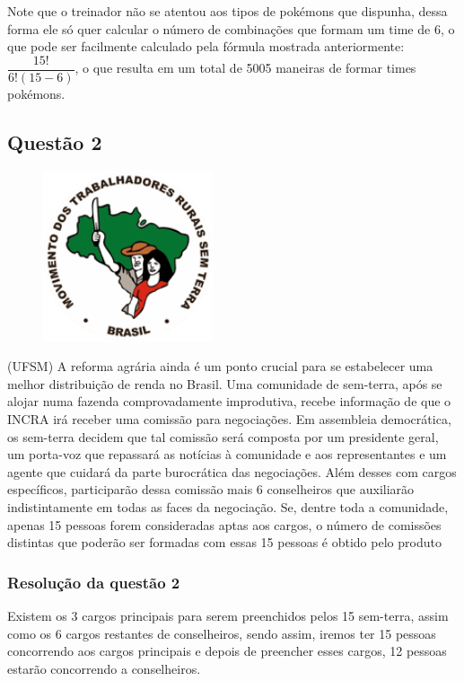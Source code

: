 Note que o treinador não se atentou aos tipos de pokémons que dispunha, dessa forma ele só quer calcular o número de combinações que formam um time de 6, o que pode ser facilmente calculado pela fórmula mostrada anteriormente: $\dfrac{15!}{6!(15-6)}$, o que resulta em um total de 5005 maneiras de formar times pokémons.

\subsection*{Questão 2}

\begin{figure}
	\includegraphics[width=5cm, left]{imagens/mst.png}
\end{figure}

(UFSM) A reforma agrária ainda é um ponto crucial para se estabelecer uma melhor distribuição de renda no Brasil. Uma comunidade de sem-terra, após se alojar numa fazenda comprovadamente improdutiva, recebe informação de que o INCRA irá receber uma comissão para negociações. Em assembleia democrática, os sem-terra decidem que tal comissão será composta por um presidente geral, um porta-voz que repassará as notícias à comunidade e aos representantes e um agente que cuidará da parte burocrática das negociações. Além desses com cargos específicos, participarão dessa comissão mais 6 conselheiros que auxiliarão indistintamente em todas as faces da negociação.
Se, dentre toda a comunidade, apenas 15 pessoas forem consideradas aptas aos cargos, o número de comissões distintas que poderão ser formadas com essas 15 pessoas é obtido pelo produto

\subsubsection*{Resolução da questão 2}

Existem os 3 cargos principais para serem preenchidos pelos 15 sem-terra, assim como os 6 cargos restantes de conselheiros, sendo assim, iremos ter 15 pessoas concorrendo aos cargos principais e depois de preencher esses cargos, 12 pessoas estarão concorrendo a conselheiros.

